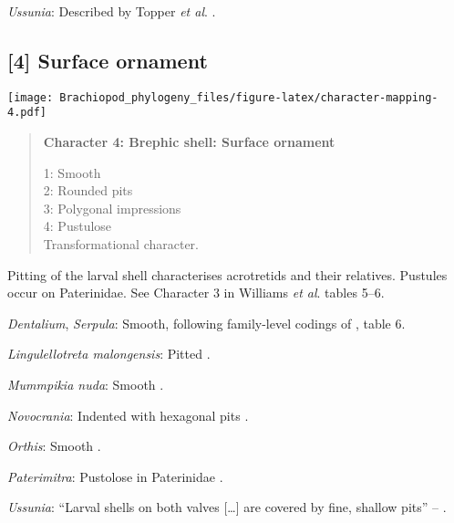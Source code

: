 \documentclass[openany]{book}
\theoremstyle{definition}
\theoremstyle{definition}
\theoremstyle{definition}
\theoremstyle{remark}
\begin{document}
\hypertarget{Ussunia-coding-3}{}
\emph{Ussunia}: Described by Topper \emph{et al}.
\citeyearpar{Topper2013Reappraisalof}.

\subsection*{{[}4{]} Surface ornament}\label{surface-ornament}

\texttt{[image: Brachiopod\_phylogeny\_files/figure-latex/character-mapping-4.pdf]}

\begin{quote}
\textbf{Character 4: Brephic shell: Surface ornament}

1: Smooth\\
2: Rounded pits\\
3: Polygonal impressions\\
4: Pustulose\\
Transformational character.
\end{quote}

Pitting of the larval shell characterises acrotretids and their
relatives. Pustules occur on Paterinidae. See Character 3 in Williams
\emph{et al}. \citeyearpar{Williams2000LinguliformeaCraniiformea} tables
5--6.

\hypertarget{Dentalium-coding-4}{}
\emph{Dentalium}, \emph{Serpula}: Smooth, following family-level codings
of \citet{Williams2000LinguliformeaCraniiformea}, table 6.

\hypertarget{Lingulellotreta_malongensis-coding-4}{}
\emph{Lingulellotreta malongensis}: Pitted \citep[table
8]{Williams2000LinguliformeaCraniiformea}.

\hypertarget{Mummpikia_nuda-coding-4}{}
\emph{Mummpikia nuda}: Smooth \citep{Holmer1997EarlyCambrian, Li2004}.

\hypertarget{Novocrania-coding-4}{}
\emph{Novocrania}: Indented with hexagonal pits \citep[appendix
2]{Williams1998Thediversity}.

\hypertarget{Orthis-coding-4}{}
\emph{Orthis}: Smooth \citep{Holmer2011Firstrecord}.

\hypertarget{Paterimitra-coding-4}{}
\emph{Paterimitra}: Pustolose in Paterinidae \citep[table
6]{Williams2000LinguliformeaCraniiformea}.

\hypertarget{Ussunia-coding-4}{}
\emph{Ussunia}: ``Larval shells on both valves {[}\ldots{}{]} are
covered by fine, shallow pits'' -- \citet{Topper2013Reappraisalof}.
\end{document}
